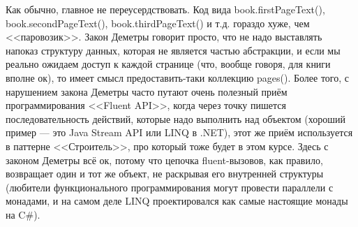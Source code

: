 \documentclass{../../text-style}
\begin{document}
Как обычно, главное не переусердствовать. Код вида book.firstPageText(), book.secondPageText(), book.thirdPageText() и т.д. гораздо хуже, чем <<паровозик>>. Закон Деметры говорит просто, что не надо выставлять напоказ структуру данных, которая не является частью абстракции, и если мы реально ожидаем доступ к каждой странице (что, вообще говоря, для книги вполне ок), то имеет смысл предоставить-таки коллекцию pages(). Более того, с нарушением закона Деметры часто путают очень полезный приём программирования <<Fluent API>>, когда через точку пишется последовательность действий, которые надо выполнить над объектом (хороший пример --- это Java Stream API или LINQ в .NET), этот же приём используется в паттерне <<Строитель>>, про который тоже будет в этом курсе. Здесь с законом Деметры всё ок, потому что цепочка fluent-вызовов, как правило, возвращает один и тот же объект, не раскрывая его внутренней структуры (любители функционального программирования могут провести параллели с монадами, и на самом деле LINQ проектировался как самые настоящие монады на C\#).
\end{document}
